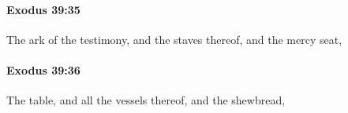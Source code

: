 		\paragraph{Exodus 39:35} %
			\label{EXODUS-39-35}

			The ark of the testimony, and the staves thereof, and the mercy seat,


		\paragraph{Exodus 39:36} %
			\label{EXODUS-39-36}

			The table, and all the vessels thereof, and the shewbread,


